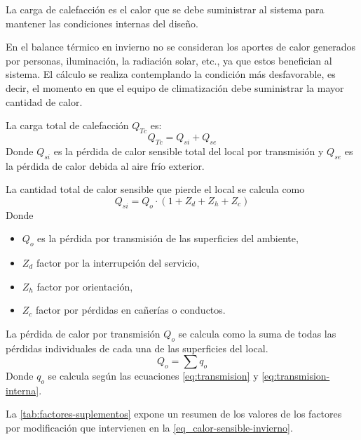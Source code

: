 La carga de calefacción es el calor que se debe suministrar al sistema para mantener las condiciones internas del diseño.

En el balance térmico en invierno no se consideran los aportes de calor generados por personas, iluminación, la radiación solar, etc., ya que estos benefician al sistema. El cálculo se realiza contemplando la condición más desfavorable, es decir, el momento en que el equipo de climatización debe suministrar la mayor cantidad de calor.

La carga total de calefacción $Q_{Tc}$ es:
\begin{equation}
	Q_{Tc} = Q_{si} + Q_{se}
\end{equation}
Donde $Q_{si}$ es la pérdida de calor sensible total del local por transmisión y $Q_{se}$ es la pérdida de calor debida al aire frío exterior.

La cantidad total de calor sensible que pierde el local se calcula como
\begin{equation}\label{eq_calor-sensible-invierno}
	Q_{si} = Q_o \cdot (1 + Z_d + Z_h + Z_c)
\end{equation}
Donde
\begin{itemize}
	\item $Q_o$ es la pérdida por transmisión de las superficies del ambiente,
	\item $Z_d$ factor por la interrupción del servicio,
	\item $Z_h$ factor por orientación,
	\item $Z_c$ factor por pérdidas en cañerías o conductos.
\end{itemize}

La pérdida de calor por transmisión $Q_o$ se calcula como la suma de todas las pérdidas individuales de cada una de las superficies del local.
\begin{equation}
	Q_o = \sum q_o
\end{equation}
Donde $q_o$ se calcula según las ecuaciones \ref{eq:transmision} y \ref{eq:transmision-interna}.

La \autoref{tab:factores-suplementos} expone un resumen de los valores de los factores por modificación que intervienen en la \autoref{eq_calor-sensible-invierno}.

